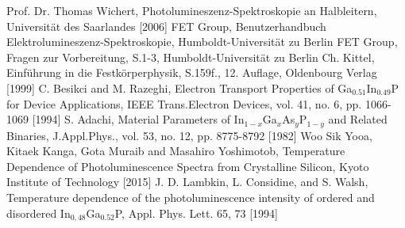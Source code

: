 \documentclass[aps,twocolumn,secnumarabic,nobalancelastpage,amsmath,amssymb,
nofootinbib,superscriptaddress]{revtex4-1}
\begin{document}


\begin{thebibliography}{99}
Prof. Dr. Thomas Wichert, Photolumineszenz-Spektroskopie an Halbleitern, Universität des Saarlandes [2006]
FET Group, Benutzerhandbuch Elektrolumineszenz-Spektroskopie, Humboldt-Universität zu Berlin
FET Group, Fragen zur Vorbereitung, S.1-3, Humboldt-Universität zu Berlin
Ch. Kittel, Einführung in die Festkörperphysik, S.159f., 12. Auflage, Oldenbourg Verlag [1999]
C. Besikci and M. Razeghi, Electron Transport Properties of Ga$_{0.51}$In$_{0.49}$P for Device Applications, IEEE Trans.Electron Devices, vol. 41, no. 6, pp. 1066-1069 [1994]
S. Adachi, Material Parameters of In$_{1-x}$Ga$_x$As$_y$P$_{1-y}$ and Related Binaries, J.Appl.Phys., vol. 53, no. 12, pp. 8775-8792 [1982]
Woo Sik Yooa, Kitaek Kanga, Gota Muraib and Masahiro Yoshimotob, Temperature Dependence of Photoluminescence Spectra from Crystalline Silicon, Kyoto Institute of Technology [2015]
J. D. Lambkin, L. Considine, and S. Walsh, Temperature dependence of the photoluminescence intensity of ordered and disordered In$_{0,48}$Ga$_{0.52}$P, Appl. Phys. Lett. 65, 73 [1994]
\end{thebibliography}


\clearpage
\appendix
\end{document}
